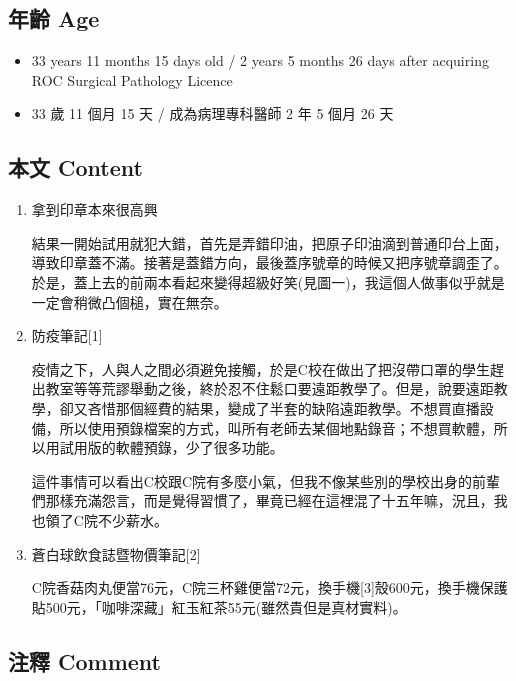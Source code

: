 \documentclass[a5paper, 11pt
]{book}
\providecommand{\tightlist}{%
  \setlength{\itemsep}{0pt}\setlength{\parskip}{0pt}}
\begin{document}
\hypertarget{ux5e74ux9f61-age-37}{%
\subsection{年齡 Age}\label{ux5e74ux9f61-age-37}}

\begin{itemize}
\tightlist
\item
  33 years 11 months 15 days old / 2 years 5 months 26 days after
  acquiring ROC Surgical Pathology Licence
\item
  33 歲 11 個月 15 天 / 成為病理專科醫師 2 年 5 個月 26 天
\end{itemize}

\hypertarget{ux672cux6587-content-37}{%
\subsection{本文 Content}\label{ux672cux6587-content-37}}

\begin{enumerate}
\def\labelenumi{\arabic{enumi}.}
\item
  拿到印章本來很高興

  結果一開始試用就犯大錯，首先是弄錯印油，把原子印油滴到普通印台上面，導致印章蓋不滿。接著是蓋錯方向，最後蓋序號章的時候又把序號章調歪了。於是，蓋上去的前兩本看起來變得超級好笑(見圖一)，我這個人做事似乎就是一定會稍微凸個槌，實在無奈。
\item
  防疫筆記{[}1{]}

  疫情之下，人與人之間必須避免接觸，於是C校在做出了把沒帶口罩的學生趕出教室等等荒謬舉動之後，終於忍不住鬆口要遠距教學了。但是，說要遠距教學，卻又吝惜那個經費的結果，變成了半套的缺陷遠距教學。不想買直播設備，所以使用預錄檔案的方式，叫所有老師去某個地點錄音；不想買軟體，所以用試用版的軟體預錄，少了很多功能。

  這件事情可以看出C校跟C院有多麼小氣，但我不像某些別的學校出身的前輩們那樣充滿怨言，而是覺得習慣了，畢竟已經在這裡混了十五年嘛，況且，我也領了C院不少薪水。
\item
  蒼白球飲食誌暨物價筆記{[}2{]}

  C院香菇肉丸便當76元，C院三杯雞便當72元，換手機{[}3{]}殼600元，換手機保護貼500元，「咖啡深藏」紅玉紅茶55元(雖然貴但是真材實料)。
\end{enumerate}

\hypertarget{ux6ce8ux91cb-comment-37}{%
\subsection{注釋 Comment}\label{ux6ce8ux91cb-comment-37}}
\end{document}
